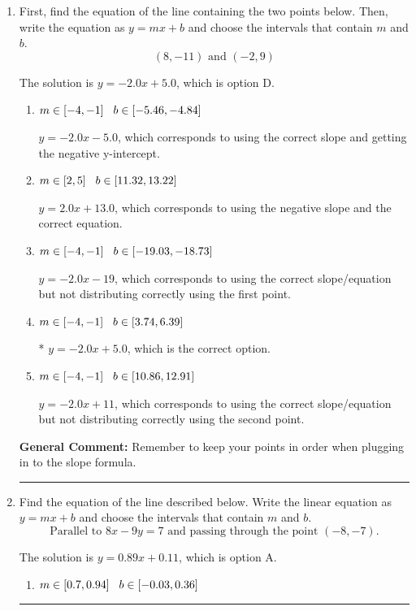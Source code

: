 \documentclass{extbook}[14pt]
\newcommand{\litem}[1]{\item #1

\rule{\textwidth}{0.4pt}}
\begin{document}
\begin{enumerate}\litem{
First, find the equation of the line containing the two points below. Then, write the equation as $ y=mx+b $ and choose the intervals that contain $m$ and $b$.
\[ (8, -11) \text{ and } (-2, 9) \]

The solution is \( y = -2.0x + 5.0 \), which is option D.\begin{enumerate}[label=\Alph*.]
\item \( m \in [-4, -1] \hspace*{3mm} b \in [-5.46, -4.84] \)

 $y = -2.0x -5.0$, which corresponds to using the correct slope and getting the negative y-intercept.
\item \( m \in [2, 5] \hspace*{3mm} b \in [11.32, 13.22] \)

 $y = 2.0x + 13.0$, which corresponds to using the negative slope and the correct equation.
\item \( m \in [-4, -1] \hspace*{3mm} b \in [-19.03, -18.73] \)

 $y = -2.0x -19$, which corresponds to using the correct slope/equation but not distributing correctly using the first point.
\item \( m \in [-4, -1] \hspace*{3mm} b \in [3.74, 6.39] \)

* $y = -2.0x + 5.0$, which is the correct option.
\item \( m \in [-4, -1] \hspace*{3mm} b \in [10.86, 12.91] \)

 $y = -2.0x + 11$, which corresponds to using the correct slope/equation but not distributing correctly using the second point.
\end{enumerate}

\textbf{General Comment:} Remember to keep your points in order when plugging in to the slope formula.
}
\litem{
Find the equation of the line described below. Write the linear equation as $ y=mx+b $ and choose the intervals that contain $m$ and $b$.
\[ \text{Parallel to } 8 x - 9 y = 7 \text{ and passing through the point } (-8, -7). \]

The solution is \( y = 0.89x + 0.11 \), which is option A.\begin{enumerate}[label=\Alph*.]
\item \( m \in [0.7, 0.94] \hspace*{3mm} b \in [-0.03, 0.36] \)


\end{enumerate}}
\end{enumerate}
\end{document}
